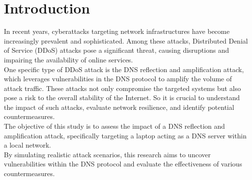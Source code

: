 \section{Introduction}
	In recent years, cyberattacks targeting network infrastructures have become increasingly prevalent and sophisticated.
	Among these attacks, Distributed Denial of Service (DDoS) attacks pose a significant threat, causing disruptions and impairing the availability of online services.\\
	One specific type of DDoS attack is the DNS reflection and amplification attack, which leverages vulnerabilities in the DNS protocol
	to amplify the volume of attack traffic.
	These attacks not only compromise the targeted systems but also pose a risk to the overall stability of the Internet.
	So it is crucial to understand the impact of such attacks, evaluate network resilience, and identify potential countermeasures.\\
	The objective of this study is to assess the impact of a DNS reflection and amplification attack, 
    specifically targeting a laptop acting as a DNS server within a local network.\\ 
    By simulating realistic attack scenarios, this research aims to uncover vulnerabilities within the DNS protocol and evaluate the effectiveness 
    of various countermeasures.